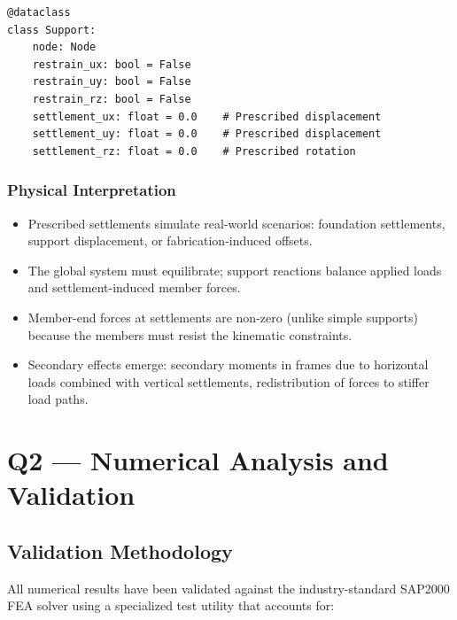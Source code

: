 \documentclass[12pt,a4paper]{article}
\begin{document}
\begin{lstlisting}[caption=Extended Support Dataclass (parser.py), label=lst:support_dataclass, basicstyle=\ttfamily\small]
@dataclass
class Support:
    node: Node
    restrain_ux: bool = False
    restrain_uy: bool = False
    restrain_rz: bool = False
    settlement_ux: float = 0.0    # Prescribed displacement
    settlement_uy: float = 0.0    # Prescribed displacement
    settlement_rz: float = 0.0    # Prescribed rotation
\end{lstlisting}

\subsubsection{Physical Interpretation}

\begin{itemize}
    \item Prescribed settlements simulate real-world scenarios: foundation settlements, support displacement, or fabrication-induced offsets.
    \item The global system must equilibrate; support reactions balance applied loads and settlement-induced member forces.
    \item Member-end forces at settlements are non-zero (unlike simple supports) because the members must resist the kinematic constraints.
    \item Secondary effects emerge: secondary moments in frames due to horizontal loads combined with vertical settlements, redistribution of forces to stiffer load paths.
\end{itemize}


\section{Q2 --- Numerical Analysis and Validation}

\subsection{Validation Methodology}

All numerical results have been validated against the industry-standard SAP2000 FEA solver using a specialized test utility that accounts for:
\end{document}
